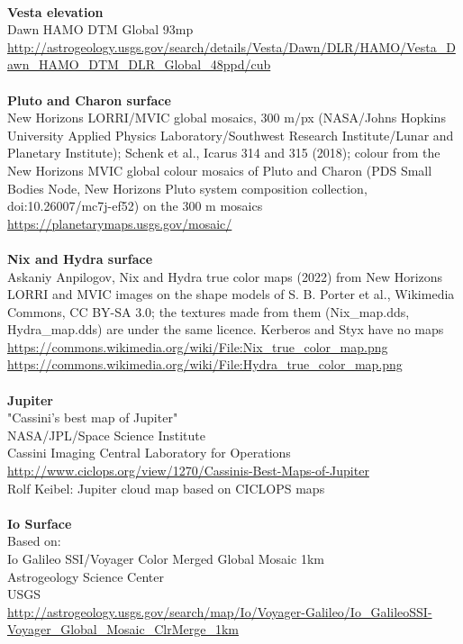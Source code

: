\documentclass[Orbiter User Manual.tex]{subfiles}
\begin{document}
\\
\textbf{Vesta elevation}\\
Dawn HAMO DTM Global 93mp\\
\url{http://astrogeology.usgs.gov/search/details/Vesta/Dawn/DLR/HAMO/Vesta_Dawn_HAMO_DTM_DLR_Global_48ppd/cub}\\
\\
\textbf{Pluto and Charon surface}\\
New Horizons LORRI/MVIC global mosaics, 300 m/px (NASA/Johns Hopkins University Applied Physics Laboratory/Southwest Research Institute/Lunar and Planetary Institute); Schenk et al., Icarus 314 and 315 (2018); colour from the New Horizons MVIC global colour mosaics of Pluto and Charon (PDS Small Bodies Node, New Horizons Pluto system composition collection, doi:10.26007/mc7j-ef52) on the 300 m mosaics\\
\url{https://planetarymaps.usgs.gov/mosaic/}\\
\\
\textbf{Nix and Hydra surface}\\
Askaniy Anpilogov, Nix and Hydra true color maps (2022) from New Horizons LORRI and MVIC images on the shape models of S. B. Porter et al., Wikimedia Commons, CC BY-SA 3.0; the textures made from them (Nix\_map.dds, Hydra\_map.dds) are under the same licence. Kerberos and Styx have no maps\\
\url{https://commons.wikimedia.org/wiki/File:Nix_true_color_map.png}\\
\url{https://commons.wikimedia.org/wiki/File:Hydra_true_color_map.png}\\
\\
\textbf{Jupiter}\\
"Cassini's best map of Jupiter"\\
NASA/JPL/Space Science Institute\\
Cassini Imaging Central Laboratory for Operations\\
\url{http://www.ciclops.org/view/1270/Cassinis-Best-Maps-of-Jupiter}\\
Rolf Keibel: Jupiter cloud map based on CICLOPS maps\\
\\
\textbf{Io Surface}\\
Based on:\\
Io Galileo SSI/Voyager Color Merged Global Mosaic 1km\\
Astrogeology Science Center\\
USGS\\
\url{http://astrogeology.usgs.gov/search/map/Io/Voyager-Galileo/Io_GalileoSSI-Voyager_Global_Mosaic_ClrMerge_1km}\\
\end{document}
